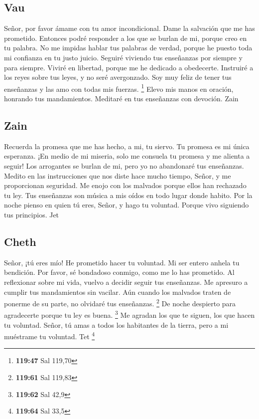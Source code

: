 \hypertarget{vau}{%
\subsection{Vau}\label{vau}}

 Señor, por favor ámame con tu amor incondicional. Dame la
salvación que me has prometido.  Entonces podré responder a
los que se burlan de mi, porque creo en tu palabra.  No me
impidas hablar tus palabras de verdad, porque he puesto toda mi
confianza en tu justo juicio.  Seguiré viviendo tus
enseñanzas por siempre y para siempre.  Viviré en libertad,
porque me he dedicado a obedecerte.  Instruiré a los reyes
sobre tus leyes, y no seré avergonzado.  Soy muy feliz de
tener tus enseñanzas y las amo con todas mis fuerzas. \footnote{\textbf{119:47}
  Sal 119,70}  Elevo mis manos en oración, honrando tus
mandamientos. Meditaré en tus enseñanzas con devoción. Zain

\hypertarget{zain}{%
\subsection{Zain}\label{zain}}

 Recuerda la promesa que me has hecho, a mi, tu siervo. Tu
promesa es mi única esperanza.  ¡En medio de mi miseria,
solo me consuela tu promesa y me alienta a seguir!  Los
arrogantes se burlan de mi, pero yo no abandonaré tus enseñanzas.
 Medito en las instrucciones que nos diste hace mucho
tiempo, Señor, y me proporcionan seguridad.  Me enojo con
los malvados porque ellos han rechazado tu ley.  Tus
enseñanzas son música a mis oídos en todo lugar donde habito.
 Por la noche pienso en quien tú eres, Señor, y hago tu
voluntad.  Porque vivo siguiendo tus principios. Jet

\hypertarget{cheth}{%
\subsection{Cheth}\label{cheth}}

 Señor, ¡tú eres mío! He prometido hacer tu voluntad.
 Mi ser entero anhela tu bendición. Por favor, sé bondadoso
conmigo, como me lo has prometido.  Al reflexionar sobre mi
vida, vuelvo a decidir seguir tus enseñanzas.  Me apresuro
a cumplir tus mandamientos sin vacilar.  Aún cuando los
malvados traten de ponerme de su parte, no olvidaré tus enseñanzas.
\footnote{\textbf{119:61} Sal 119,83}  De noche despierto
para agradecerte porque tu ley es buena. \footnote{\textbf{119:62} Sal
  42,9}  Me agradan los que te siguen, los que hacen tu
voluntad.  Señor, tú amas a todos los habitantes de la
tierra, pero a mi muéstrame tu voluntad. Tet \footnote{\textbf{119:64}
  Sal 33,5}

